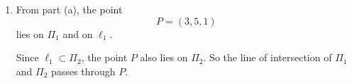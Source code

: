 \documentclass[leqno]{article}
\begin{document}
\begin{enumerate}[
  label=\textbf{\arabic*.},
  leftmargin=*,
  topsep=0pt,
  partopsep=0pt,
  parsep=0pt
]
\begin{tcolorbox}[colback=white, colframe=scarlet, title={\textbf{Solution}}, breakable, grow to left by=6mm, grow to right by=10mm]
\begin{enumerate}[label=\textbf{(\alph*)}]
Now reflect the direction vector $\mathbf u$.

\begin{align*}
\mathbf u\cdot\mathbf n
&=
\begin{pmatrix}2\\1\\1\end{pmatrix}\cdot
\begin{pmatrix}3\\-1\\2\end{pmatrix}\\
&=6-1+2\\
&=7
\end{align*}

Hence
\begin{align*}
\mathbf u'
&=
\mathbf u
-2\,\frac{\mathbf u\cdot\mathbf n}{\mathbf n\cdot\mathbf n}\,\mathbf n\\
&=
\mathbf u
-2\,\frac{7}{14}\,\mathbf n\\
&=
\mathbf u-\mathbf n\\
&=
\begin{pmatrix}2\\1\\1\end{pmatrix}
-
\begin{pmatrix}3\\-1\\2\end{pmatrix}\\
&=
\begin{pmatrix}-1\\2\\-1\end{pmatrix}
\end{align*}

Therefore the reflected line $\ell_2$ has vector equation
\[
\mathbf r=
\begin{pmatrix}4\\3\\2\end{pmatrix}
+
\mu
\begin{pmatrix}-1\\2\\-1\end{pmatrix}
\]

which is the required result.

  \item From part (a), the point
\[
P=(3,5,1)
\]
lies on $\Pi_1$ and on $\ell_1$.

Since $\ell_1\subset \Pi_2$, the point $P$ also lies on $\Pi_2$. So the line of intersection of $\Pi_1$ and $\Pi_2$ passes through $P$.


\end{enumerate}
\end{tcolorbox}
\end{enumerate}
\end{document}
